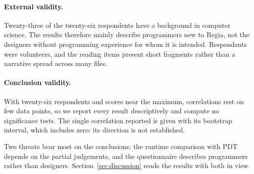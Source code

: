 \paragraph{External validity.} Twenty-three of the twenty-six respondents have a background in computer science. The results therefore mainly describe programmers new to Regia, not the designers without programming experience for whom it is intended. Respondents were volunteers, and the reading items present short fragments rather than a narrative spread across many files.
 
\paragraph{Conclusion validity.} With twenty-six respondents and scores near the maximum, correlations rest on few data points, so we report every result descriptively and compute no significance tests. The single correlation reported is given with its bootstrap interval, which includes zero: its direction is not established.
 
\medskip
 
Two threats bear most on the conclusions: the runtime comparison with PDT depends on the partial judgements, and the questionnaire describes programmers rather than designers. Section~\ref{sec:discussion} reads the results with both in view.